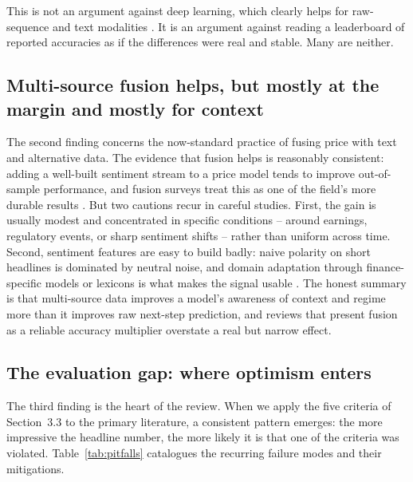 \documentclass[10pt,a4paper,twocolumn]{article}
\begin{document}
This is not an argument against deep learning, which clearly helps for raw-sequence and text modalities \cite{fischer2018,hu2018}. It is an argument against reading a leaderboard of reported accuracies as if the differences were real and stable. Many are neither.

\subsection{Multi-source fusion helps, but mostly at the margin and mostly for context}

The second finding concerns the now-standard practice of fusing price with text and alternative data. The evidence that fusion helps is reasonably consistent: adding a well-built sentiment stream to a price model tends to improve out-of-sample performance, and fusion surveys treat this as one of the field's more durable results \cite{thakkar2021,xu2018}. But two cautions recur in careful studies. First, the gain is usually modest and concentrated in specific conditions -- around earnings, regulatory events, or sharp sentiment shifts -- rather than uniform across time. Second, sentiment features are easy to build badly: naive polarity on short headlines is dominated by neutral noise, and domain adaptation through finance-specific models or lexicons is what makes the signal usable \cite{loughran2011,araci2019}. The honest summary is that multi-source data improves a model's awareness of context and regime more than it improves raw next-step prediction, and reviews that present fusion as a reliable accuracy multiplier overstate a real but narrow effect.

\subsection{The evaluation gap: where optimism enters}

The third finding is the heart of the review. When we apply the five criteria of Section~3.3 to the primary literature, a consistent pattern emerges: the more impressive the headline number, the more likely it is that one of the criteria was violated. Table~\ref{tab:pitfalls} catalogues the recurring failure modes and their mitigations.
\end{document}

